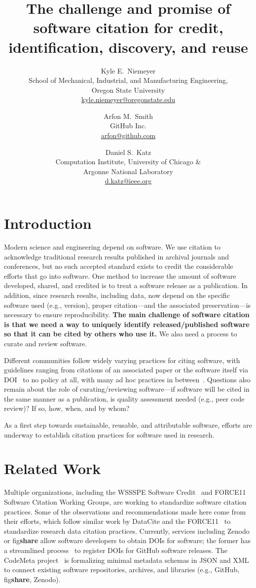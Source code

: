 \documentclass[letterpaper,10pt]{article}
\title{The challenge and promise of software citation for credit, identification, discovery, and reuse}
\author{
Kyle E.\ Niemeyer\\
School of Mechanical, Industrial, and Manufacturing Engineering,\\
Oregon State University\\
\href{mailto:kyle.niemeyer@oregonstate.edu}{kyle.niemeyer@oregonstate.edu}
\and
Arfon M.\ Smith\\
GitHub Inc.\\
\href{mailto:arfon@github.com}{arfon@github.com}
\and
Daniel S.\ Katz\\
Computation Institute, University of Chicago \&\\
Argonne National Laboratory\\
\href{mailto:d.katz@ieee.org}{d.katz@ieee.org}
}
\date{}
\begin{document}
\maketitle

\section{Introduction}

Modern science and engineering depend on software.
We use citation to acknowledge traditional research results published in archival journals and conferences, but no such accepted standard exists to credit the considerable efforts that go into software.
One method to increase the amount of software developed, shared, and credited is to treat a software release as a publication. 
In addition, since research results, including data, now depend on the specific software used (e.g., version), proper citation---and the associated preservation---is necessary to ensure reproducibility.
\textbf{The main challenge of software citation is that we need a way to uniquely identify released\slash published software so that it can be cited by others who use it.}
We also need a process to curate and review software.

Different communities follow widely varying practices for citing software, with guidelines ranging from citations of an associated paper or the software itself via DOI~\citep{AAS:2016} to no policy at all, with many ad hoc practices in between~\citep{Howison2015}.
Questions also remain about the role of curating\slash reviewing software---if software will be cited in the same manner as a publication, is quality assessment needed (e.g., peer code review)?
If so, how, when, and by whom?

As a first step towards sustainable, reusable, and attributable software, efforts are underway to establish citation practices for software used in research.

\section{Related Work}

Multiple organizations, including the WSSSPE Software Credit~\citep{WSSSPE1,WSSSPE2,WSSSPE3} and FORCE11 Software Citation Working Groups, are working to standardize software citation practices.
Some of the observations and recommendations made here come from their efforts, which follow similar work by DataCite and the FORCE11~\citet{DataCitation2014} to standardize research data citation practices.
Currently, services including Zenodo or fig\textbf{share} allow software developers to obtain DOIs for software; the former has a streamlined process~\citep{GitHubZenodo} to register DOIs for GitHub software releases.
The CodeMeta project~\citep{CodeMeta} is formalizing minimal metadata schemas in JSON and XML to connect existing software repositories, archives, and libraries (e.g., GitHub, fig\textbf{share}, Zenodo).
\end{document}
